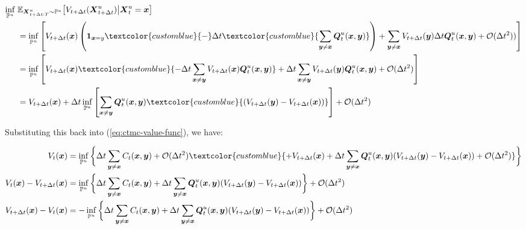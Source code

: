 \documentclass{article}
\newcommand{\bluetext}[1]{\textcolor{customblue}{#1}}
\begin{document}
\begin{small}
\begin{align}
    \inf_{\mathbb{P}^u}\; &\mathbb{E}_{\boldsymbol{X}^u_{t+\Delta t:T}\sim \mathbb{P}^u}\big[V_{t+\Delta t}(\boldsymbol{X}^u_{t+\Delta t})\big |\boldsymbol{X}^u_t=\boldsymbol{x}\big]\nonumber\\
    &=\inf_{\mathbb{P}^u}\left[V_{t+\Delta t}(\boldsymbol{x})\left(\boldsymbol{1}_{\boldsymbol{x}=y}\bluetext{-}\Delta t\bluetext{\sum_{\boldsymbol{y}\neq \boldsymbol{x}}\boldsymbol{Q}^u_t(\boldsymbol{x},\boldsymbol{y})}\right)+\sum_{\boldsymbol{y}\neq \boldsymbol{x}}V_{t+\Delta t}(\boldsymbol{y})\Delta t\boldsymbol{Q}_t^u(\boldsymbol{x},\boldsymbol{y})+\mathcal{O}(\Delta t^2))\right]\nonumber\\
    &=\inf_{\mathbb{P}^u}\left[V_{t+\Delta t}(\boldsymbol{x})\bluetext{-\Delta t\sum_{\boldsymbol{x}\neq \boldsymbol{y}}V_{t+\Delta t}(\boldsymbol{x})\boldsymbol{Q}_t^u(\boldsymbol{x},\boldsymbol{y})}+\Delta t\sum_{\boldsymbol{x}\neq \boldsymbol{y}}V_{t+\Delta t}(\boldsymbol{y})\boldsymbol{Q}_t^u(\boldsymbol{x},\boldsymbol{y})+\mathcal{O}(\Delta t^2)\right]\nonumber\\
    &=V_{t+\Delta t}(\boldsymbol{x})+\Delta t\inf_{\mathbb{P}^u}\left[\sum_{\boldsymbol{x}\neq \boldsymbol{y}}\boldsymbol{Q}_t^u(\boldsymbol{x},\boldsymbol{y})\bluetext{(V_{t+\Delta t}(\boldsymbol{y})-V_{t+\Delta t}(\boldsymbol{x}))}\right]+\mathcal{O}(\Delta t^2)
\end{align}
\end{small}
Substituting this back into (\ref{eq:ctmc-value-func}), we have:
\begin{small}
\begin{align}
    V_t(\boldsymbol{x})&=\inf_{\mathbb{P}^u}\bigg\{\Delta t\sum_{\boldsymbol{y}\neq \boldsymbol{x}}C_t(\boldsymbol{x}, \boldsymbol{y})+\mathcal{O}(\Delta t^2)\bluetext{+V_{t+\Delta t}(\boldsymbol{x})+\Delta t\sum_{\boldsymbol{y}\neq \boldsymbol{x}}\boldsymbol{Q}_t^u(\boldsymbol{x},\boldsymbol{y})(V_{t+\Delta t}(\boldsymbol{y})-V_{t+\Delta t}(\boldsymbol{x}))+\mathcal{O}(\Delta t^2)}\bigg\}\nonumber\\
    V_t(\boldsymbol{x})-V_{t+\Delta t}(\boldsymbol{x})&=\inf_{\mathbb{P}^u}\bigg\{\Delta t\sum_{\boldsymbol{y}\neq \boldsymbol{x}}C_t(\boldsymbol{x}, \boldsymbol{y})+\Delta t\sum_{\boldsymbol{y}\neq \boldsymbol{x}}\boldsymbol{Q}_t^u(\boldsymbol{x},\boldsymbol{y})(V_{t+\Delta t}(\boldsymbol{y})-V_{t+\Delta t}(\boldsymbol{x}))\bigg\}+\mathcal{O}(\Delta t^2)\nonumber\\
    V_{t+\Delta t}(\boldsymbol{x})-V_t(\boldsymbol{x})&=-\inf_{\mathbb{P}^u}\bigg\{\Delta t\sum_{\boldsymbol{y}\neq \boldsymbol{x}}C_t(\boldsymbol{x}, \boldsymbol{y})+\Delta t\sum_{\boldsymbol{y}\neq \boldsymbol{x}}\boldsymbol{Q}_t^u(\boldsymbol{x},\boldsymbol{y})(V_{t+\Delta t}(\boldsymbol{y})-V_{t+\Delta t}(\boldsymbol{x}))\bigg\}+\mathcal{O}(\Delta t^2)
\end{align}
\end{small}
\end{document}
